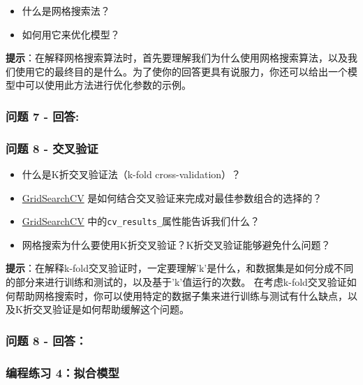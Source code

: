 \documentclass[11pt]{article}
\providecommand{\tightlist}{%
      \setlength{\itemsep}{0pt}\setlength{\parskip}{0pt}}
\begin{document}
\begin{itemize}
\tightlist
\item
  什么是网格搜索法？
\item
  如何用它来优化模型？
\end{itemize}

\textbf{提示}：在解释网格搜索算法时，首先要理解我们为什么使用网格搜索算法，以及我们使用它的最终目的是什么。为了使你的回答更具有说服力，你还可以给出一个模型中可以使用此方法进行优化参数的示例。

    \subsubsection{问题 7 - 回答:}\label{ux95eeux9898-7---ux56deux7b54}

    \subsubsection{问题 8 -
交叉验证}\label{ux95eeux9898-8---ux4ea4ux53c9ux9a8cux8bc1}

\begin{itemize}
\tightlist
\item
  什么是K折交叉验证法（k-fold cross-validation）？
\item
  \href{http://scikit-learn.org/stable/modules/generated/sklearn.model_selection.GridSearchCV.html}{GridSearchCV}
  是如何结合交叉验证来完成对最佳参数组合的选择的？
\item
  \href{http://scikit-learn.org/stable/modules/generated/sklearn.model_selection.GridSearchCV.html}{GridSearchCV}
  中的\texttt{\textquotesingle{}cv\_results\_\textquotesingle{}}属性能告诉我们什么？
\item
  网格搜索为什么要使用K折交叉验证？K折交叉验证能够避免什么问题？
\end{itemize}

\textbf{提示}：在解释k-fold交叉验证时，一定要理解'k'是什么，和数据集是如何分成不同的部分来进行训练和测试的，以及基于'k'值运行的次数。
在考虑k-fold交叉验证如何帮助网格搜索时，你可以使用特定的数据子集来进行训练与测试有什么缺点，以及K折交叉验证是如何帮助缓解这个问题。

    \subsubsection{问题 8 - 回答：}\label{ux95eeux9898-8---ux56deux7b54}

    \subsubsection{编程练习
4：拟合模型}\label{ux7f16ux7a0bux7ec3ux4e60-4ux62dfux5408ux6a21ux578b}
\end{document}
